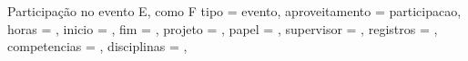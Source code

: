 \begin{atividade}{Participação no evento E, como F}{
  tipo         = evento,
  aproveitamento = participacao,   %
  horas        = {},   %
  inicio       = {},   %
  fim          = {},   %
  projeto      = {},
  papel        = {},   %
  supervisor   = {},   %
  registros    = {},   %
  competencias = {},   %
  disciplinas  = {},   %
}

\begin{contexto}
\end{contexto}

\begin{contribuicao}
\end{contribuicao}

\begin{desenvolvimento}


\end{desenvolvimento}
\end{atividade}
